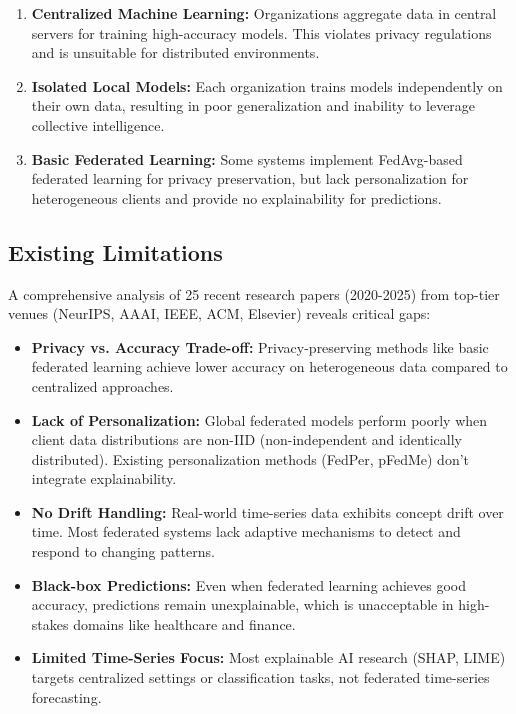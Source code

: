 \documentclass[11pt, a4paper]{article}
\begin{document}
\begin{enumerate}[noitemsep, topsep=0pt]
    \item \textbf{Centralized Machine Learning:} Organizations aggregate data in central servers for training high-accuracy models. This violates privacy regulations and is unsuitable for distributed environments.
    
    \item \textbf{Isolated Local Models:} Each organization trains models independently on their own data, resulting in poor generalization and inability to leverage collective intelligence.
    
    \item \textbf{Basic Federated Learning:} Some systems implement FedAvg-based federated learning for privacy preservation, but lack personalization for heterogeneous clients and provide no explainability for predictions.
\end{enumerate}

\subsection{Existing Limitations}

A comprehensive analysis of 25 recent research papers (2020-2025) from top-tier venues (NeurIPS, AAAI, IEEE, ACM, Elsevier) reveals critical gaps:

\begin{itemize}[noitemsep, topsep=0pt]
    \item \textbf{Privacy vs. Accuracy Trade-off:} Privacy-preserving methods like basic federated learning achieve lower accuracy on heterogeneous data compared to centralized approaches.
    
    \item \textbf{Lack of Personalization:} Global federated models perform poorly when client data distributions are non-IID (non-independent and identically distributed). Existing personalization methods (FedPer, pFedMe) don't integrate explainability.
    
    \item \textbf{No Drift Handling:} Real-world time-series data exhibits concept drift over time. Most federated systems lack adaptive mechanisms to detect and respond to changing patterns.
    
    \item \textbf{Black-box Predictions:} Even when federated learning achieves good accuracy, predictions remain unexplainable, which is unacceptable in high-stakes domains like healthcare and finance.
    
    \item \textbf{Limited Time-Series Focus:} Most explainable AI research (SHAP, LIME) targets centralized settings or classification tasks, not federated time-series forecasting.
\end{itemize}
\end{document}

